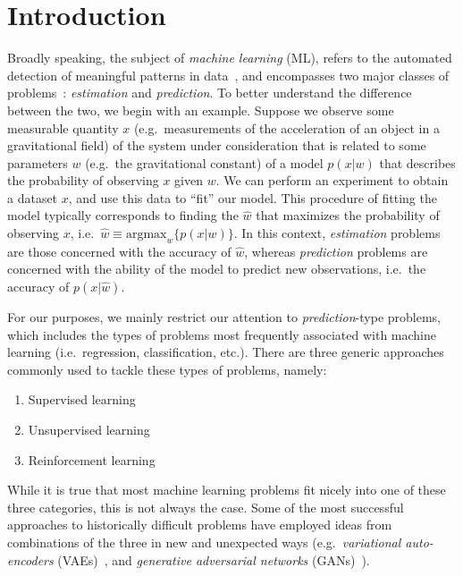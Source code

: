 \documentclass[../main.tex]{subfiles}
\begin{document}
\section{Introduction}

Broadly speaking, the subject of \emph{machine learning} (ML), refers to the
automated detection of meaningful patterns in
data~\cite{shalev2014understanding}, and encompasses two major classes of
problems~\cite{Mehta_high_bias_2019}: \emph{estimation} and \emph{prediction}. 
%
%
To better understand the difference between the two, we begin with an example.
%
Suppose we observe some measurable quantity $x$ (e.g.\ measurements of the
acceleration of an object in a gravitational field) of the system under
consideration that is related to some parameters $w$ (e.g.\ the gravitational
constant) of a model $p (x | w)$ that describes the probability of observing
$x$ given $w$.
%
We can perform an experiment to obtain a dataset $x$, and use this data to
``fit'' our model. This procedure of fitting the model typically corresponds to
finding the $\hat w$ that maximizes the probability of observing $x$, i.e.\
$\hat{w} \equiv \mathrm{argmax}_{w} \{p (x|w)\}$.
%
In this context, \emph{estimation} problems are those concerned with the
accuracy of $\hat{w}$, whereas \emph{prediction} problems are concerned with
the ability of the model to predict new observations, i.e.\ the accuracy of $p
(x|\hat{w})$.

For our purposes, we mainly restrict our attention to \emph{prediction}-type
problems, which includes the types of problems most frequently associated with
machine learning (i.e.\ regression, classification, etc.).
There are three generic approaches commonly used to tackle these types of
problems, namely: 

%
\begin{enumerate}
  \item Supervised learning
  \item Unsupervised learning
  \item Reinforcement learning
\end{enumerate}
%
While it is true that most machine learning problems fit nicely into one of
these three categories, this is not always the case.
%
Some of the most successful approaches to historically difficult problems have
employed ideas from combinations of the three in new and unexpected ways (e.g.\
\emph{variational auto-encoders} (VAEs)~\cite{kingma2013auto}, and
\emph{generative adversarial networks} (GANs)~\cite{goodfellow2014generative}).
\end{document}
